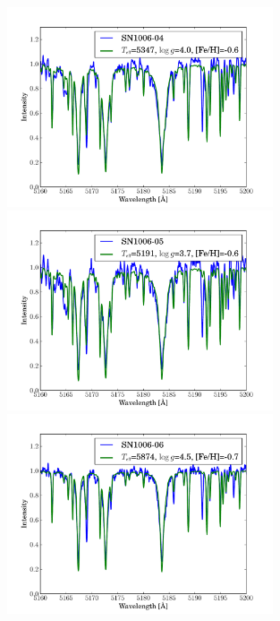 \begin{figure}[htbp]
   \label{fig:sn1006_stelparam}
\end{figure}\begin{figure}[htbp] %
   \centering
\includegraphics[width=0.7\textwidth, trim=0 0mm 0 10mm, clip]{chapter_sn1006/plots/gold_spectra/sn1006_04.pdf}
\includegraphics[width=0.7\textwidth, trim=0 0mm 0 10mm, clip]{chapter_sn1006/plots/gold_spectra/sn1006_05.pdf}
\includegraphics[width=0.7\textwidth, trim=0 0mm 0 10mm, clip]{chapter_sn1006/plots/gold_spectra/sn1006_06.pdf}


\end{figure}
